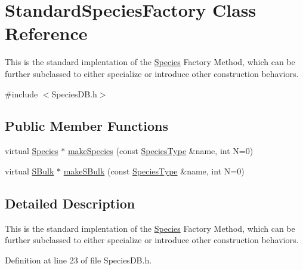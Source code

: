 \hypertarget{classStandardSpeciesFactory}{\section{Standard\-Species\-Factory Class Reference}
\label{classStandardSpeciesFactory}
}


This is the standard implentation of the \hyperlink{classSpecies}{Species} Factory Method, which can be further subclassed to either specialize or introduce other construction behaviors.  




{\ttfamily \#include $<$Species\-D\-B.\-h$>$}

\subsection*{Public Member Functions}
\begin{DoxyCompactItemize}
\item 
virtual \hyperlink{classSpecies}{Species} $\ast$ \hyperlink{classStandardSpeciesFactory_a443b03c240a3c0d57517712b4dc0ed8a}{make\-Species} (const \hyperlink{Species_8h_af8f3afcc030f67a124aa4a6b5badf495}{Species\-Type} \&name, int N=0)
\item 
virtual \hyperlink{classSBulk}{S\-Bulk} $\ast$ \hyperlink{classStandardSpeciesFactory_a1b24dd2690c1086ac28fb6bc0f2b164e}{make\-S\-Bulk} (const \hyperlink{Species_8h_af8f3afcc030f67a124aa4a6b5badf495}{Species\-Type} \&name, int N=0)
\end{DoxyCompactItemize}


\subsection{Detailed Description}
This is the standard implentation of the \hyperlink{classSpecies}{Species} Factory Method, which can be further subclassed to either specialize or introduce other construction behaviors. 

Definition at line 23 of file Species\-D\-B.\-h.



